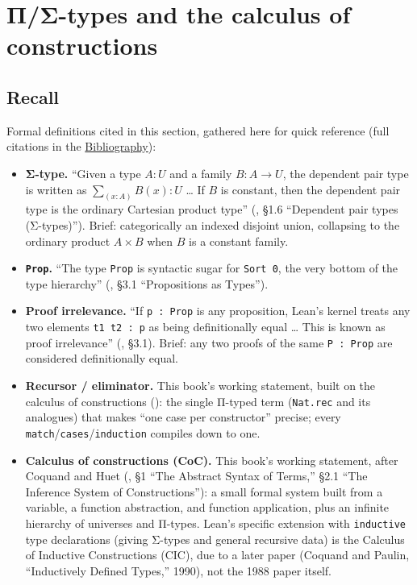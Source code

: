 \section{Π/Σ-types and the calculus of constructions}\label{sec:01-basics:05-pi-sigma-and-coc:1}

\subsection{Recall}\label{sec:01-basics:05-pi-sigma-and-coc:2}

Formal definitions cited in this section, gathered here for quick reference (full citations in the \hyperref[sec:root:bibliography:1]{Bibliography}):

\begin{itemize}
\tightlist
\item
  \textbf{Σ-type.} ``Given a type \(A : U\) and a family \(B : A \to U\), the dependent pair type is written as \(\sum_{(x:A)} B(x) : U\) \ldots{} If \(B\) is constant, then the dependent pair type is the ordinary Cartesian product type'' (\cite{HoTT2013}, §1.6 ``Dependent pair types (Σ-types)''). Brief: categorically an indexed disjoint union, collapsing to the ordinary product \(A \times B\) when \(B\) is a constant family.
\item
  \textbf{\texttt{Prop}.} ``The type \texttt{Prop} is syntactic sugar for \texttt{Sort 0}, the very bottom of the type hierarchy'' (\cite{TPIL4}, §3.1 ``Propositions as Types'').
\item
  \textbf{Proof irrelevance.} ``If \texttt{p : Prop} is any proposition, Lean's kernel treats any two elements \texttt{t1 t2 : p} as being definitionally equal \ldots{} This is known as proof irrelevance'' (\cite{TPIL4}, §3.1). Brief: any two proofs of the same \texttt{P : Prop} are considered definitionally equal.
\item
  \textbf{Recursor / eliminator.} This book's working statement, built on the calculus of constructions (\cite{CoquandHuet1988}): the single Π-typed term (\texttt{Nat.rec} and its analogues) that makes ``one case per constructor'' precise; every \texttt{match}/\texttt{cases}/\texttt{induction} compiles down to one.
\item
  \textbf{Calculus of constructions (CoC).} This book's working statement, after Coquand and Huet (\cite{CoquandHuet1988}, §1 ``The Abstract Syntax of Terms,'' §2.1 ``The Inference System of Constructions''): a small formal system built from a variable, a function abstraction, and function application, plus an infinite hierarchy of universes and Π-types. Lean's specific extension with \texttt{inductive} type declarations (giving Σ-types and general recursive data) is the Calculus of Inductive Constructions (CIC), due to a later paper (Coquand and Paulin, ``Inductively Defined Types,'' 1990), not the 1988 paper itself.
\end{itemize}

